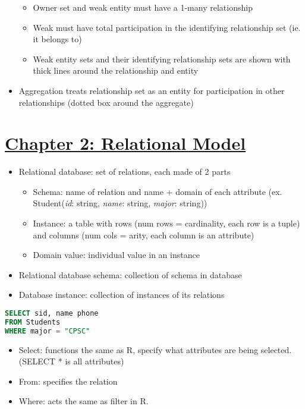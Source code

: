 \documentclass[8pt,landscape,a4paper, fleqn, dvipsnames]{extarticle}
\begin{document}
\begin{multicols*}{4}
\begin{itemize}
\begin{itemize}
        \item Owner set and weak entity must have a 1-many relationship
        \item Weak must have total participation in the identifying relationship set (ie. it belongs to)
        \item Weak entity sets and their identifying relationship sets are shown with thick lines around the relationship and entity
    \end{itemize}
    \item Aggregation treats relationship set as an entity for participation in other relationships (dotted box around the aggregate)
    \end{itemize}

\section*{\ul{Chapter 2: Relational Model}}
\begin{itemize}
    \item Relational database: set of relations, each made of 2 parts
    \begin{itemize}
        \item Schema: name of relation and name + domain of each attribute (ex. Student(\textit{id}: string, \textit{name}: string, \textit{major}: string))
        \item Instance: a table with rows (num rows = cardinality, each row is a tuple) and columns (num cols = arity, each column is an attribute)
        \item Domain value: individual value in an instance
    \end{itemize}
    \item Relational database schema: collection of schema in database
    \item Database instance: collection of instances of its relations
\end{itemize}
\begin{lstlisting}[language = SQL]
SELECT sid, name phone
FROM Students
WHERE major = "CPSC"
\end{lstlisting}
\begin{itemize}
    \item Select: functions the same as R, specify what attributes are being selected. (SELECT * is all attributes)
    \item From: specifies the relation
    \item Where: acts the same as filter in R.
\end{itemize}

\end{multicols*}
\end{document}
